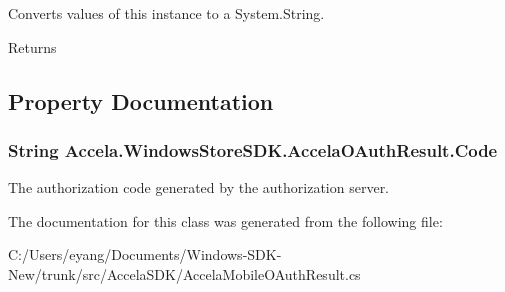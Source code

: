 Converts values of this instance to a System.\+String. 

\begin{DoxyReturn}{Returns}

\end{DoxyReturn}


\subsection{Property Documentation}
\hypertarget{class_accela_1_1_windows_store_s_d_k_1_1_accela_o_auth_result_a1477e14f12a8b2ccc0db29f81b6c03c5}{
\subsubsection[{Code}]{\setlength{\rightskip}{0pt plus 5cm}String Accela.\+Windows\+Store\+S\+D\+K.\+Accela\+O\+Auth\+Result.\+Code\hspace{0.3cm}{\ttfamily [get]}}}\label{class_accela_1_1_windows_store_s_d_k_1_1_accela_o_auth_result_a1477e14f12a8b2ccc0db29f81b6c03c5}


The authorization code generated by the authorization server. 



The documentation for this class was generated from the following file\+:\begin{DoxyCompactItemize}
\item 
C\+:/\+Users/eyang/\+Documents/\+Windows-\/\+S\+D\+K-\/\+New/trunk/src/\+Accela\+S\+D\+K/Accela\+Mobile\+O\+Auth\+Result.\+cs\end{DoxyCompactItemize}
